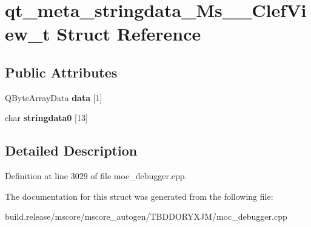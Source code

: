 \hypertarget{structqt__meta__stringdata___ms_____clef_view__t}{}\section{qt\+\_\+meta\+\_\+stringdata\+\_\+\+Ms\+\_\+\+\_\+\+Clef\+View\+\_\+t Struct Reference}
\label{structqt__meta__stringdata___ms_____clef_view__t}
\subsection*{Public Attributes}
\begin{DoxyCompactItemize}
\item 
\mbox{\label{structqt__meta__stringdata___ms_____clef_view__t_af4bf178e1080828022c2f2ccab62ea28}} 
Q\+Byte\+Array\+Data {\bfseries data} \mbox{[}1\mbox{]}
\item 
\mbox{\label{structqt__meta__stringdata___ms_____clef_view__t_aac7faf9d55434d6e66e85221f7f912e1}} 
char {\bfseries stringdata0} \mbox{[}13\mbox{]}
\end{DoxyCompactItemize}


\subsection{Detailed Description}


Definition at line 3029 of file moc\+\_\+debugger.\+cpp.



The documentation for this struct was generated from the following file\+:\begin{DoxyCompactItemize}
\item 
build.\+release/mscore/mscore\+\_\+autogen/\+T\+B\+D\+D\+O\+R\+Y\+X\+J\+M/moc\+\_\+debugger.\+cpp\end{DoxyCompactItemize}
